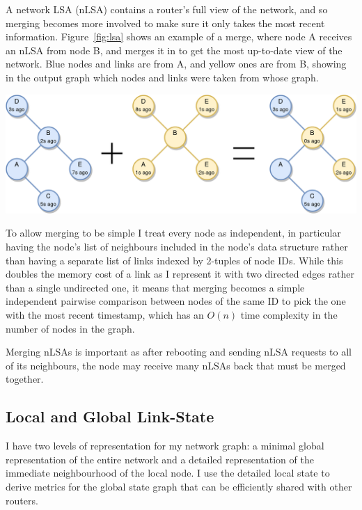 \documentclass[withindex,glossary,openany]{cam-thesis}
\begin{document}
A network LSA (nLSA) contains a router's full view of the network, and so merging becomes more involved to make sure it only takes the most recent information. Figure~\ref{fig:lsa} shows an example of a merge, where node A receives an nLSA from node B, and merges it in to get the most up-to-date view of the network. Blue nodes and links are from A, and yellow ones are from B, showing in the output graph which nodes and links were taken from whose graph.

\begin{center}
\begin{minipage}{0.9\textwidth} \centering
	\includegraphics[width=1\textwidth]{lsa}
	\label{fig:lsa}
\end{minipage}
\end{center}

To allow merging to be simple I treat every node as independent, in particular having the node's list of neighbours included in the node's data structure rather than having a separate list of links indexed by 2-tuples of node IDs. While this doubles the memory cost of a link as I represent it with two directed edges rather than a single undirected one, it means that merging becomes a simple independent pairwise comparison between nodes of the same ID to pick the one with the most recent timestamp, which has an $O(n)$ time complexity in the number of nodes in the graph.

Merging nLSAs is important as after rebooting and sending nLSA requests to all of its neighbours, the node may receive many nLSAs back that must be merged together.

\subsection{Local and Global Link-State}
\label{subsec:landg_state}

I have two levels of representation for my network graph: a minimal global representation of the entire network and a detailed representation of the immediate neighbourhood of the local node. I use the detailed local state to derive metrics for the global state graph that can be efficiently shared with other routers.
\end{document}
